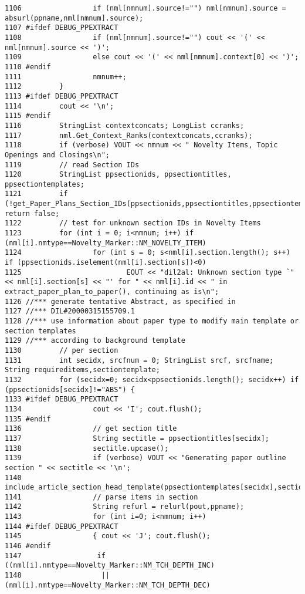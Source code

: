 \begin{verbatim}
1106                 if (nml[nmnum].source!="") nml[nmnum].source = absurl(ppname,nml[nmnum].source);
1107 #ifdef DEBUG_PPEXTRACT
1108                 if (nml[nmnum].source!="") cout << '(' << nml[nmnum].source << ')';
1109                 else cout << '(' << nml[nmnum].context[0] << ')';
1110 #endif
1111                 nmnum++;
1112         }
1113 #ifdef DEBUG_PPEXTRACT
1114         cout << '\n';
1115 #endif
1116         StringList contextconcats; LongList ccranks;
1117         nml.Get_Context_Ranks(contextconcats,ccranks);
1118         if (verbose) VOUT << nmnum << " Novelty Items, Topic Openings and Closings\n";
1119         // read Section IDs
1120         StringList ppsectionids, ppsectiontitles, ppsectiontemplates;
1121         if (!get_Paper_Plans_Section_IDs(ppsectionids,ppsectiontitles,ppsectiontemplates)) return false;
1122         // test for unknown section IDs in Novelty Items
1123         for (int i = 0; i<nmnum; i++) if (nml[i].nmtype==Novelty_Marker::NM_NOVELTY_ITEM)
1124                 for (int s = 0; s<nml[i].section.length(); s++) if (ppsectionids.iselement(nml[i].section[s])<0)
1125                         EOUT << "dil2al: Unknown section type `" << nml[i].section[s] << "' for " << nml[i].id << " in extract_paper_plan_to_paper(), continuing as is\n";
1126 //*** generate tentative Abstract, as specified in
1127 //*** DIL#20000315155709.1
1128 //*** use information about paper type to modify main template or section templates
1129 //*** according to background template
1130         // per section
1131         int secidx, srcfnum = 0; StringList srcf, srcfname; String requireditems,sectiontemplate;
1132         for (secidx=0; secidx<ppsectionids.length(); secidx++) if (ppsectionids[secidx]!="ABS") {
1133 #ifdef DEBUG_PPEXTRACT
1134                 cout << 'I'; cout.flush();
1135 #endif
1136                 // get section title
1137                 String sectitle = ppsectiontitles[secidx];
1138                 sectitle.upcase();
1139                 if (verbose) VOUT << "Generating paper outline section " << sectitle << '\n';
1140                 include_article_section_head_template(ppsectiontemplates[secidx],sectiontemplate,ostrtext,pprevtext);
1141                 // parse items in section
1142                 String refurl = relurl(pout,ppname);
1143                 for (int i=0; i<nmnum; i++)
1144 #ifdef DEBUG_PPEXTRACT
1145                 { cout << 'J'; cout.flush();
1146 #endif
1147                  if ((nml[i].nmtype==Novelty_Marker::NM_TCH_DEPTH_INC)
1148                   || (nml[i].nmtype==Novelty_Marker::NM_TCH_DEPTH_DEC)

\end{verbatim}

